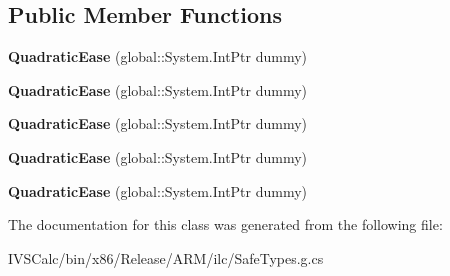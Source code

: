 \subsection*{Public Member Functions}
\begin{DoxyCompactItemize}
\item 
\mbox{\label{class_windows_1_1_u_i_1_1_xaml_1_1_media_1_1_animation_1_1_quadratic_ease_ab88646055a1637225593a3cb4705f565}} 
{\bfseries Quadratic\+Ease} (global\+::\+System.\+Int\+Ptr dummy)
\item 
\mbox{\label{class_windows_1_1_u_i_1_1_xaml_1_1_media_1_1_animation_1_1_quadratic_ease_ab88646055a1637225593a3cb4705f565}} 
{\bfseries Quadratic\+Ease} (global\+::\+System.\+Int\+Ptr dummy)
\item 
\mbox{\label{class_windows_1_1_u_i_1_1_xaml_1_1_media_1_1_animation_1_1_quadratic_ease_ab88646055a1637225593a3cb4705f565}} 
{\bfseries Quadratic\+Ease} (global\+::\+System.\+Int\+Ptr dummy)
\item 
\mbox{\label{class_windows_1_1_u_i_1_1_xaml_1_1_media_1_1_animation_1_1_quadratic_ease_ab88646055a1637225593a3cb4705f565}} 
{\bfseries Quadratic\+Ease} (global\+::\+System.\+Int\+Ptr dummy)
\item 
\mbox{\label{class_windows_1_1_u_i_1_1_xaml_1_1_media_1_1_animation_1_1_quadratic_ease_ab88646055a1637225593a3cb4705f565}} 
{\bfseries Quadratic\+Ease} (global\+::\+System.\+Int\+Ptr dummy)
\end{DoxyCompactItemize}


The documentation for this class was generated from the following file\+:\begin{DoxyCompactItemize}
\item 
I\+V\+S\+Calc/bin/x86/\+Release/\+A\+R\+M/ilc/Safe\+Types.\+g.\+cs\end{DoxyCompactItemize}
